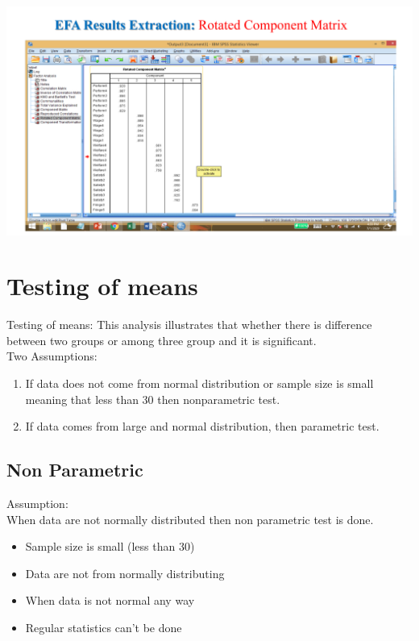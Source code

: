 \documentclass[
  letterpaper,
  DIV=11,
  numbers=noendperiod]{scrreprt}
\providecommand{\tightlist}{%
  \setlength{\itemsep}{0pt}\setlength{\parskip}{0pt}}\usepackage{longtable,booktabs,array}
\begin{document}
\includegraphics{images/slides/img_Page_080.png}


\chapter{Testing of means}\label{testing-of-means}

Testing of means: This analysis illustrates that whether there is
difference between two groups or among three group and it is
significant.\\

Two Assumptions:\\

\begin{enumerate}
\def\labelenumi{\arabic{enumi}.}
\tightlist
\item
  If data does not come from normal distribution or sample size is small
  meaning that less than 30 then nonparametric test.\\
\item
  If data comes from large and normal distribution, then parametric
  test.\\
\end{enumerate}

\section{Non Parametric}\label{non-parametric}

{Assumption:}\\

When data are not normally distributed then non parametric test is
done.\\

\begin{itemize}
\tightlist
\item
  Sample size is small (less than 30)\\
\item
  Data are not from normally distributing\\
\item
  When data is not normal any way\\
\item
  Regular statistics can't be done\\
\end{itemize}
\end{document}
